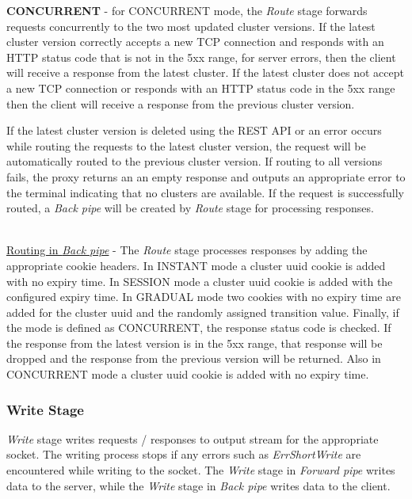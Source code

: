 \documentclass[a4paper,11pt,twoside]{report}
\begin{document}
\begin{list}{-}{}
   \item{\textbf{CONCURRENT}} - for CONCURRENT mode, the \textit{Route} stage forwards requests concurrently to the two most updated cluster versions.  If the latest cluster version correctly accepts a new TCP connection and responds with an HTTP status code that is not in the 5xx range, for server errors, then the client will receive a response from the latest cluster.  If the latest cluster does not accept a new TCP connection or responds with an HTTP status code in the 5xx range then the client will receive a response from the previous cluster version.
\end{list}

\noindent
If the latest cluster version is deleted using the REST API or an error occurs while routing the requests to the latest cluster version, the request will be automatically routed to the previous cluster version. If routing to all versions fails, the proxy returns an an empty response and outputs an appropriate error to the terminal indicating that no clusters are available. If the request is successfully routed, a \textit{Back pipe} will be created by \textit{Route} stage for processing responses.   

\noindent\\
\underline{Routing in \textit{Back pipe}} - The \textit{Route} stage processes responses by adding the appropriate cookie headers.  In INSTANT mode a cluster uuid cookie is added with no expiry time.  In SESSION mode a cluster uuid cookie is added with the configured expiry time.  In GRADUAL mode two cookies with no expiry time are added for the cluster uuid and the randomly assigned transition value.  Finally, if the mode is defined as CONCURRENT, the response status code is checked. If the response from the latest version is in the 5xx range, that response will be dropped and the response from the previous version will be returned.  Also in CONCURRENT mode a cluster uuid cookie is added with no expiry time.\bigskip

\subsubsection*{Write Stage} 
\textit{Write} stage writes requests / responses to output stream for the appropriate socket. The writing process stops if any errors such as \textit{ErrShortWrite} are encountered while writing to the socket. The \textit{Write} stage in \textit{Forward pipe} writes data to the server, while the \textit{Write} stage in \textit{Back pipe} writes data to the client. 
\end{document}
